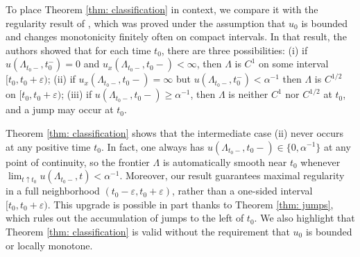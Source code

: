 \documentclass{article}
\numberwithin{equation}{section}
\numberwithin{figure}{section}
\theoremstyle{plain}
\theoremstyle{plain}
\theoremstyle{plain}
\theoremstyle{plain}
\theoremstyle{definition}
\theoremstyle{remark}
\def\vep{\varepsilon}
\begin{document}
To place Theorem \ref{thm: classification} in context, we compare it with the regularity result of \cite[Thm. 1.1]{delarue}, which was proved under the assumption that $u_0$ is bounded and changes monotonicity finitely often on compact intervals. In that result, the authors showed that for each time $t_0$, there are three possibilities: (i) if \(u(\Lambda_{t_0-},t_{0}^{-})=0\) and $u_x(\Lambda_{t_0-},t_0-)<\infty$, then \(\Lambda\) is \(C^{1}\) on some interval \([t_{0},t_{0}+\varepsilon)\);  
(ii) if $u_x(\Lambda_{t_0-},t_0-)=\infty$ but \(u(\Lambda_{t_0-},t_{0}^{-})<\alpha^{-1}\) then \(\Lambda\) is \(C^{1/2}\) on \([t_{0},t_{0}+\varepsilon)\);  
(iii) if \(u(\Lambda_{t_0-},t_{0}-)\ge \alpha^{-1}\), then \(\Lambda\) is neither \(C^{1}\) nor \(C^{1/2}\) at \(t_{0}\), and a jump may occur at $t_0$. 

Theorem \ref{thm: classification} shows that the intermediate case (ii) never occurs at any positive time $t_0$. In fact, one always has $u(\Lambda_{t_0-},t_0-)\in \{0,\alpha^{-1}\}$ at any point of continuity, so the frontier $\Lambda$ is automatically smooth near $t_0$ whenever $\lim_{t \uparrow t_0}u(\Lambda_{t_0-},t)<\alpha^{-1}.$ Moreover, our result guarantees maximal regularity in a full neighborhood $(t_0-\vep,t_0+\vep)$, rather than a one-sided interval $[t_0,t_0+\vep)$. This upgrade is possible in part thanks to Theorem \ref{thm: jumps}, which rules out the accumulation of jumps to the left of $t_0$. We also highlight that Theorem \ref{thm: classification} is valid without the requirement that $u_0$ is bounded or locally monotone.
\end{document}
